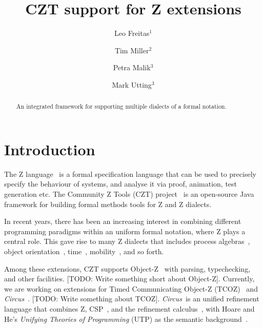 \documentclass{llncs}
\newcommand{\Circus}{{\sf\slshape Circus}}
\begin{document}
\title{CZT support for Z extensions}
\author{Leo Freitas$^1$ \and Tim Miller$^2$ \and Petra Malik$^3$ \and Mark Utting$^3$}


\maketitle


\begin{abstract}
  An integrated framework for supporting multiple dialects of a formal
  notation.
\end{abstract}

\section{Introduction} \label{sec:intro}

  The Z language~\cite{isoz} is a formal specification language that
  can be used to precisely specify the behaviour of systems, and
  analyse it via proof, animation, test generation etc.  The Community
  Z Tools (CZT) project~\cite{czt} is an open-source Java framework
  for building formal methods tools for Z and Z dialects.

  In recent years, there has been an increasing interest in combining
  different programming paradigms within an uniform formal notation,
  where Z plays a central role. This gave rise to many Z dialects that
  includes process
  algebras~\cite{fischer-1998,fischer-2000,circus.sem:intro}, object
  orientation~\cite{oz,ohcircus},
  time~\cite{tcoz,circus.sem:real.time2},
  mobility~\cite{circus.sem:mobility}, and so forth.

  Among these extensions, CZT supports Object-Z~\cite{oz} with
  parsing, typechecking, and other facilities.  [TODO: Write something
  short about Object-Z].  Currently, we are working on extensions for
  Timed Communicating Object-Z (TCOZ)~\cite{tcoz} and
  \Circus~\cite{circus.sem:intro}.  [TODO: Write something about
  TCOZ].  \Circus\ is an unified refinement language that combines Z,
  CSP~\cite{csp.books:roscoe}, and the refinement
  calculus~\cite{fm.ref:morgan}, with Hoare and He's \textit{Unifying
  Theories of Programming} (UTP) as the semantic
  background~\cite{hoare.utp}.
\end{document}
